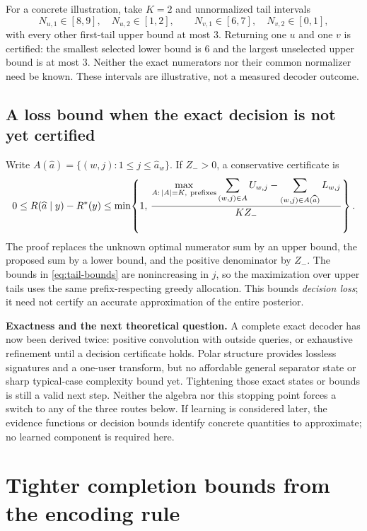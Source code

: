 \documentclass[10pt,a4paper]{article}
\begin{document}
For a concrete illustration, take $K=2$ and unnormalized tail intervals
\[
 N_{u,1}\in[8,9],\quad N_{u,2}\in[1,2],\qquad
 N_{v,1}\in[6,7],\quad N_{v,2}\in[0,1],
\]
with every other first-tail upper bound at most $3$. Returning one $u$ and one $v$ is certified:
the smallest selected lower bound is $6$ and the largest unselected upper bound is at most $3$.
Neither the exact numerators nor their common normalizer need be known.
These intervals are illustrative, not a measured decoder outcome.

\subsection{A loss bound when the exact decision is not yet certified}
Write $A(\widehat a)=\{(w,j):1\leq j\leq\widehat a_w\}$. If $Z_->0$, a conservative certificate is
\begin{equation}
 0\leq R(\widehat a\mid y)-R^*(y)
 \leq \min\!\left\{1,\,
 \frac{\displaystyle\max_{A:\,|A|=K,\ {\rm prefixes}}\sum_{(w,j)\in A}U_{w,j}
       -\displaystyle\sum_{(w,j)\in A(\widehat a)}L_{w,j}}
      {K Z_-}\right\}.
 \label{eq:risk-certificate}
\end{equation}
The proof replaces the unknown optimal numerator sum by an upper bound, the proposed sum by a lower bound,
and the positive denominator by $Z_-$. The bounds in \eqref{eq:tail-bounds} are nonincreasing in $j$,
so the maximization over upper tails uses the same prefix-respecting greedy allocation.
This bounds \emph{decision loss}; it need not certify an accurate approximation of the entire posterior.

\textbf{Exactness and the next theoretical question.} A complete exact decoder has now been derived twice:
positive convolution with outside queries, or exhaustive refinement until a decision certificate holds.
Polar structure provides lossless signatures and a one-user transform, but no affordable general separator
state or sharp typical-case complexity bound yet. Tightening those exact states or bounds is still a valid
next step. Neither the algebra nor this stopping point forces a switch to any of the three routes below.
If learning is considered later, the evidence functions or decision bounds identify concrete quantities to
approximate; no learned component is required here.

\clearpage
\section{Tighter completion bounds from the encoding rule}
\label{sec:completion-dual}
\end{document}
